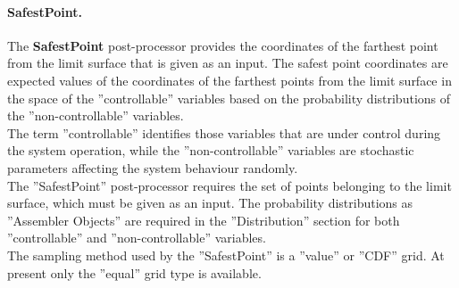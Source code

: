 \paragraph{SafestPoint.}
\label{SafestPoint}
The \textbf{SafestPoint} post-processor provides the coordinates of the farthest point from the limit surface that is given as an input.
The safest point coordinates are expected values of the coordinates of the farthest points from the limit surface in the space of the ''controllable'' variables based on the probability distributions of the ''non-controllable'' variables.
\\The term ''controllable'' identifies those variables that are under control during the system operation, while the ''non-controllable'' variables are stochastic parameters affecting the system behaviour randomly. 
\\The ''SafestPoint'' post-processor requires the set of points belonging to the limit surface, which must be given as an input. The probability distributions as ''Assembler Objects'' are required in the ''Distribution'' section for both ''controllable'' and ''non-controllable'' variables.
\\The sampling method used by the ''SafestPoint'' is a ''value'' or ''CDF'' grid. At present only the ''equal'' grid type is available.
